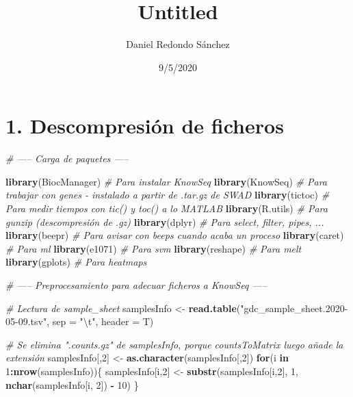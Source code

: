 \documentclass[
]{article}
\title{Untitled}
\author{Daniel Redondo Sánchez}
\date{9/5/2020}
\newenvironment{Shaded}{\begin{snugshade}}{\end{snugshade}}
\newcommand{\CharTok}[1]{\textcolor[rgb]{0.31,0.60,0.02}{#1}}
\newcommand{\CommentTok}[1]{\textcolor[rgb]{0.56,0.35,0.01}{\textit{#1}}}
\newcommand{\ControlFlowTok}[1]{\textcolor[rgb]{0.13,0.29,0.53}{\textbf{#1}}}
\newcommand{\DataTypeTok}[1]{\textcolor[rgb]{0.13,0.29,0.53}{#1}}
\newcommand{\DecValTok}[1]{\textcolor[rgb]{0.00,0.00,0.81}{#1}}
\newcommand{\KeywordTok}[1]{\textcolor[rgb]{0.13,0.29,0.53}{\textbf{#1}}}
\newcommand{\NormalTok}[1]{#1}
\newcommand{\OperatorTok}[1]{\textcolor[rgb]{0.81,0.36,0.00}{\textbf{#1}}}
\newcommand{\StringTok}[1]{\textcolor[rgb]{0.31,0.60,0.02}{#1}}
\begin{document}
\maketitle

\hypertarget{descompresiuxf3n-de-ficheros}{%
\section{1. Descompresión de
ficheros}\label{descompresiuxf3n-de-ficheros}}

\begin{Shaded}
\begin{Highlighting}[]
\CommentTok{# ----- Carga de paquetes -----}

\KeywordTok{library}\NormalTok{(BiocManager) }\CommentTok{# Para instalar KnowSeq}
\KeywordTok{library}\NormalTok{(KnowSeq)     }\CommentTok{# Para trabajar con genes - instalado a partir de .tar.gz de SWAD}
\KeywordTok{library}\NormalTok{(tictoc)      }\CommentTok{# Para medir tiempos con tic() y toc() a lo MATLAB }
\KeywordTok{library}\NormalTok{(R.utils)     }\CommentTok{# Para gunzip (descompresión de .gz)}
\KeywordTok{library}\NormalTok{(dplyr)       }\CommentTok{# Para select, filter, pipes, ...}
\KeywordTok{library}\NormalTok{(beepr)       }\CommentTok{# Para avisar con beeps cuando acaba un proceso}
\KeywordTok{library}\NormalTok{(caret)       }\CommentTok{# Para ml}
\KeywordTok{library}\NormalTok{(e1071)       }\CommentTok{# Para svm}
\KeywordTok{library}\NormalTok{(reshape)     }\CommentTok{# Para melt}
\KeywordTok{library}\NormalTok{(gplots)      }\CommentTok{# Para heatmaps}

\CommentTok{# ----- Preprocesamiento para adecuar ficheros a KnowSeq -----}

\CommentTok{# Lectura de sample_sheet}
\NormalTok{samplesInfo <-}\StringTok{ }\KeywordTok{read.table}\NormalTok{(}\StringTok{"gdc_sample_sheet.2020-05-09.tsv"}\NormalTok{, }\DataTypeTok{sep =} \StringTok{"}\CharTok{\textbackslash{}t}\StringTok{"}\NormalTok{, }\DataTypeTok{header =}\NormalTok{ T)}

\CommentTok{# Se elimina ".counts.gz" de samplesInfo, porque countsToMatrix luego añade la extensión}
\NormalTok{samplesInfo[,}\DecValTok{2}\NormalTok{] <-}\StringTok{ }\KeywordTok{as.character}\NormalTok{(samplesInfo[,}\DecValTok{2}\NormalTok{])}
\ControlFlowTok{for}\NormalTok{(i }\ControlFlowTok{in} \DecValTok{1}\OperatorTok{:}\KeywordTok{nrow}\NormalTok{(samplesInfo))\{}
\NormalTok{  samplesInfo[i,}\DecValTok{2}\NormalTok{] <-}\StringTok{ }\KeywordTok{substr}\NormalTok{(samplesInfo[i,}\DecValTok{2}\NormalTok{], }\DecValTok{1}\NormalTok{, }\KeywordTok{nchar}\NormalTok{(samplesInfo[i, }\DecValTok{2}\NormalTok{]) }\OperatorTok{-}\StringTok{ }\DecValTok{10}\NormalTok{)}
\NormalTok{\}}


\end{Highlighting}
\end{Shaded}
\end{document}
